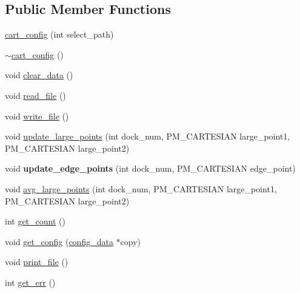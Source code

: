 \subsection*{Public Member Functions}
\begin{DoxyCompactItemize}
\item 
\mbox{\hyperlink{classcart__config_a080069ffff0306121fc494e37b05fdd7}{cart\+\_\+config}} (int select\+\_\+path)
\item 
\mbox{\hyperlink{classcart__config_ae9aafdb5141c1e8851700c72d083fc9b}{$\sim$cart\+\_\+config}} ()
\item 
void \mbox{\hyperlink{classcart__config_a2e952dab59fce74b82bad81a3cf41ee2}{clear\+\_\+data}} ()
\item 
void \mbox{\hyperlink{classcart__config_a0b51cf14079dce155ac292ff43869c69}{read\+\_\+file}} ()
\item 
void \mbox{\hyperlink{classcart__config_afda8f2022ce8e2bb9a79f99cadad670c}{write\+\_\+file}} ()
\item 
void \mbox{\hyperlink{classcart__config_a1bd9d29b6529a9ada7404f1829da58a8}{update\+\_\+large\+\_\+points}} (int dock\+\_\+num, P\+M\+\_\+\+C\+A\+R\+T\+E\+S\+I\+AN large\+\_\+point1, P\+M\+\_\+\+C\+A\+R\+T\+E\+S\+I\+AN large\+\_\+point2)
\item 
\mbox{\label{classcart__config_ab5f34a358566d6149efda9429eba9123}} 
void {\bfseries update\+\_\+edge\+\_\+points} (int dock\+\_\+num, P\+M\+\_\+\+C\+A\+R\+T\+E\+S\+I\+AN edge\+\_\+point)
\item 
void \mbox{\hyperlink{classcart__config_ad35fbb7f1aa613931ef059b40c94832b}{avg\+\_\+large\+\_\+points}} (int dock\+\_\+num, P\+M\+\_\+\+C\+A\+R\+T\+E\+S\+I\+AN large\+\_\+point1, P\+M\+\_\+\+C\+A\+R\+T\+E\+S\+I\+AN large\+\_\+point2)
\item 
int \mbox{\hyperlink{classcart__config_a3f52caad207b08c3b48554fcb2abb8a3}{get\+\_\+count}} ()
\item 
void \mbox{\hyperlink{classcart__config_ab4ae31c21f8865a8fe0db542c5de0a15}{get\+\_\+config}} (\mbox{\hyperlink{structconfig__data}{config\+\_\+data}} $\ast$copy)
\item 
void \mbox{\hyperlink{classcart__config_ae51db45ded29529cbb52878fddc001f7}{print\+\_\+file}} ()
\item 
int \mbox{\hyperlink{classcart__config_a4a9bcdd8b2ca21ea2a8622923aa32ea2}{get\+\_\+err}} ()
\end{DoxyCompactItemize}
